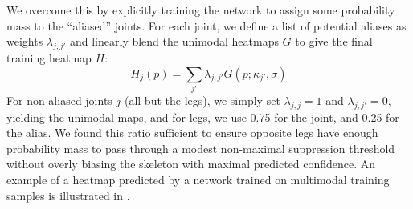We overcome this by explicitly training the network to assign some probability mass to the ``aliased'' joints. For each joint, we define a list of potential aliases as weights $\lambda_{j,j'}$ and linearly blend the unimodal heatmaps $G$ to give the final training heatmap $H$:
\begin{equation}
    H_{j}(p) = \sum_{j'} \lambda_{j,j'} G(p; \kappa_{j'}, \sigma)
\end{equation}
For non-aliased joints $j$ (all but the legs), we simply set $\lambda_{j,j} = 1$ and $\lambda_{j,j'} = 0$, yielding the unimodal maps, and for legs, we use 0.75 for the joint, and 0.25 for the alias.  We found this ratio sufficient to ensure opposite legs have enough probability mass to pass through a modest non-maximal suppression threshold without overly biasing the skeleton with maximal predicted confidence. An example of a heatmap predicted by a network trained on multimodal training samples is illustrated in . 

